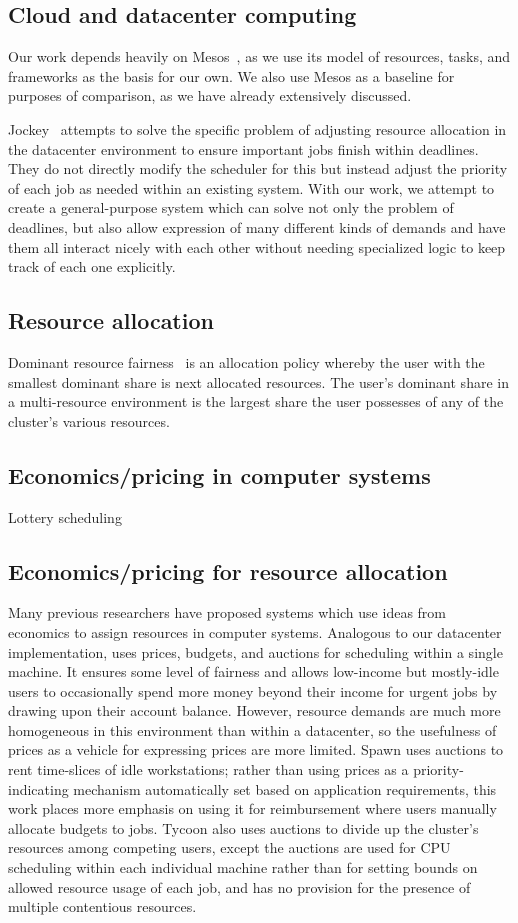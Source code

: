 \documentclass{acm_proc_article-sp}
\begin{document}
\subsection{Cloud and datacenter computing}
Our work depends heavily on Mesos~\cite{mesos}, as we use its model of
resources, tasks, and frameworks as the basis for our own. We also use Mesos as
a baseline for purposes of comparison, as we have already extensively discussed.

Jockey~\cite{jockey} attempts to solve the specific problem of adjusting
resource allocation in the datacenter environment to ensure important jobs
finish within deadlines. They do not directly modify the scheduler for this but
instead adjust the priority of each job as needed within an existing system.
With our work, we attempt to create a general-purpose system which can solve not
only the problem of deadlines, but also allow expression of many different kinds
of demands and have them all interact nicely with each other without needing
specialized logic to keep track of each one explicitly.

\subsection{Resource allocation}
Dominant resource fairness~\cite{drf} is an allocation policy whereby the user with the smallest dominant share is next allocated resources. The user's dominant share in a multi-resource environment is the largest share the user possesses of any of the cluster's various resources.

\subsection{Economics/pricing in computer systems}
Lottery scheduling

\subsection{Economics/pricing for resource allocation}
Many previous researchers have proposed systems which use ideas from economics
to assign resources in computer systems.  Analogous to our datacenter
implementation, \cite{stoica94} uses prices, budgets, and auctions for
scheduling within a single machine. It ensures some level of fairness and
allows low-income but mostly-idle users to occasionally spend more money beyond
their income for urgent jobs by drawing upon their account balance. However,
resource demands are much more homogeneous in this environment than within a
datacenter, so the usefulness of prices as a vehicle for expressing prices are
more limited. Spawn \cite{spawn} uses auctions to rent time-slices of idle
workstations; rather than using prices as a priority-indicating mechanism
automatically set based on application requirements, this work places more
emphasis on using it for reimbursement where users manually allocate budgets to
jobs. Tycoon \cite{tycoon} also uses auctions to divide up the cluster's
resources among competing users, except the auctions are used for CPU scheduling
within each individual machine rather than for setting bounds on allowed
resource usage of each job, and has no provision for the presence of
multiple contentious resources.
\end{document}
